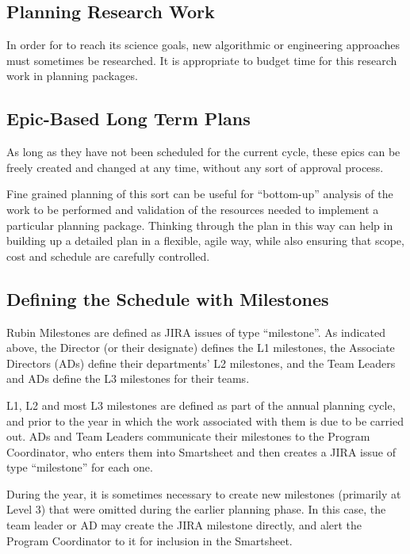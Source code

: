 \subsection{Planning Research Work}
\label{sec:long-term-research}

In order for \RO  to reach its science goals, new algorithmic or engineering approaches must sometimes be researched.
It is appropriate to budget time for this research work in planning packages.

\subsection{Epic-Based Long Term Plans}

As long as they have not been scheduled for the current \gls{cycle}, these \glspl{epic} can be freely created and changed at any time, without any sort of approval process.

Fine grained planning of this sort can be useful for ``bottom-up''
analysis of the work to be performed and validation of the resources
needed to implement a particular planning package. Thinking through the
plan in this way can help in building up a detailed plan in a flexible,
agile way, while also ensuring that scope, cost and schedule are
carefully controlled.


\subsection{Defining the Schedule with Milestones}

Rubin Milestones are defined as \gls{JIRA} issues of type ``milestone''. As indicated above, the Director (or their designate) defines the L1 milestones, the Associate Directors (ADs) define their departments' L2 milestones, and the Team Leaders and ADs define the L3 milestones for their teams.

L1, L2 and most L3 milestones are defined as part of the annual planning cycle, and prior to the year in which the work associated with them is due to be carried out. ADs and Team Leaders communicate their milestones to the Program Coordinator, who enters them into Smartsheet and then creates a \gls{JIRA} issue of type ``milestone'' for each one.

During the year, it is sometimes necessary to create new milestones (primarily at Level 3) that were omitted during the earlier planning phase. In this case, the team leader or AD may create the \gls{JIRA} milestone directly, and alert the Program Coordinator to it for inclusion in the Smartsheet.

